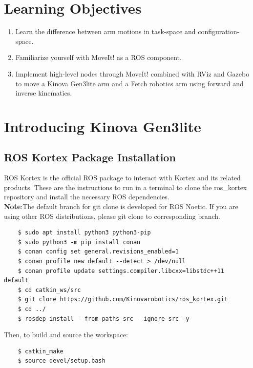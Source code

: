 \documentclass[12pt]{article}
\begin{document}
	\MakeScribeTop


\section{Learning Objectives}
\begin{enumerate}
    \item Learn the difference between arm motions in task-space and configuration-space.
    
    \item Familiarize yourself with MoveIt! as a ROS component.
    
    \item Implement high-level nodes through MoveIt! combined with RViz and Gazebo to move a Kinova Gen3lite arm and a Fetch robotics arm using forward and inverse kinematics.
\end{enumerate}


\section{Introducing Kinova Gen3lite
}
\subsection{ROS Kortex Package Installation}
ROS Kortex is the official ROS package to interact with Kortex and its related products. These are the instructions to run in a terminal to clone the ros\_kortex repository and install the necessary ROS dependencies. \\
\textbf{Note}:The default branch for git clone is developed for ROS Noetic. If you are using other ROS distributions, please git clone to corresponding branch.
\begin{verbatim}
    $ sudo apt install python3 python3-pip
    $ sudo python3 -m pip install conan
    $ conan config set general.revisions_enabled=1
    $ conan profile new default --detect > /dev/null
    $ conan profile update settings.compiler.libcxx=libstdc++11 default
    $ cd catkin_ws/src
    $ git clone https://github.com/Kinovarobotics/ros_kortex.git
    $ cd ../
    $ rosdep install --from-paths src --ignore-src -y
    \end{verbatim}
Then, to build and source the workspace:
\begin{verbatim}
    $ catkin_make
    $ source devel/setup.bash
    \end{verbatim}
\end{document}

